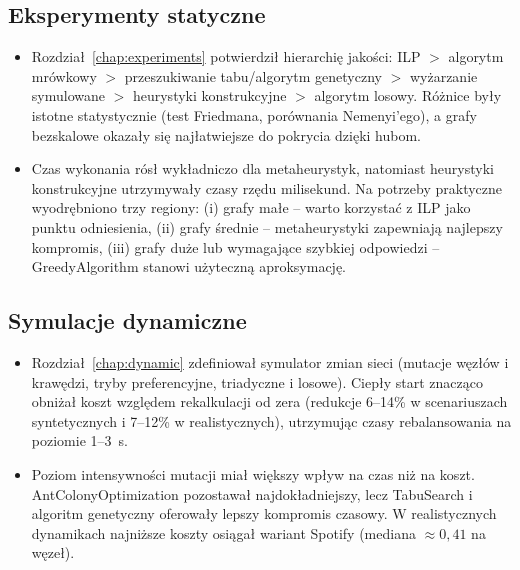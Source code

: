 \subsection*{Eksperymenty statyczne}
\begin{itemize}
  \item Rozdział~\ref{chap:experiments} potwierdził hierarchię jakości: ILP $>$ algorytm mrówkowy $>$ przeszukiwanie tabu/algorytm genetyczny $>$ wyżarzanie symulowane $>$ heurystyki konstrukcyjne $>$ algorytm losowy. Różnice były istotne statystycznie (test Friedmana, porównania Nemenyi'ego), a grafy bezskalowe okazały się najłatwiejsze do pokrycia dzięki hubom.
  \item Czas wykonania rósł wykładniczo dla metaheurystyk, natomiast heurystyki konstrukcyjne utrzymywały czasy rzędu milisekund. Na potrzeby praktyczne wyodrębniono trzy regiony: (i) grafy małe -- warto korzystać z ILP jako punktu odniesienia, (ii) grafy średnie -- metaheurystyki zapewniają najlepszy kompromis, (iii) grafy duże lub wymagające szybkiej odpowiedzi -- GreedyAlgorithm stanowi użyteczną aproksymację.
\end{itemize}

\subsection*{Symulacje dynamiczne}
\begin{itemize}
  \item Rozdział~\ref{chap:dynamic} zdefiniował symulator zmian sieci (mutacje węzłów i krawędzi, tryby preferencyjne, triadyczne i losowe). Ciepły start znacząco obniżał koszt względem rekalkulacji od zera (redukcje 6--14\% w scenariuszach syntetycznych i 7--12\% w realistycznych), utrzymując czasy rebalansowania na poziomie 1--3~s.
  \item Poziom intensywności mutacji miał większy wpływ na czas niż na koszt. AntColonyOptimization pozostawał najdokładniejszy, lecz TabuSearch i algoritm genetyczny oferowały lepszy kompromis czasowy. W realistycznych dynamikach najniższe koszty osiągał wariant Spotify (mediana $\approx0{,}41$ na węzeł).
\end{itemize}

